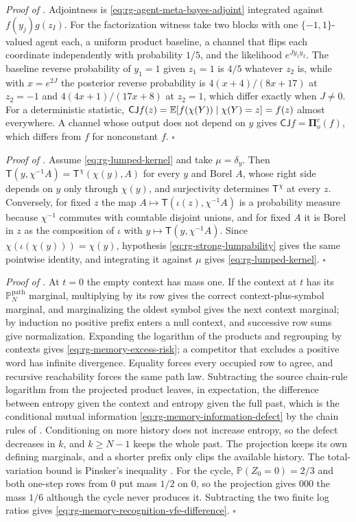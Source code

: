 \noindent\emph{Proof of .}
Adjointness is \eqref{eq:rg-agent-meta-bayes-adjoint} integrated against
$f(y_j)g(z_I)$. For the factorization witness take two blocks with one
$\{-1,1\}$-valued agent each, a uniform product baseline, a channel that flips each
coordinate independently with probability $1/5$, and the likelihood
$e^{Jy_1y_2}$. The baseline reverse probability of $y_1=1$ given $z_1=1$ is $4/5$
whatever $z_2$ is, while with $x=e^{2J}$ the posterior reverse probability is
$4(x+4)/(8x+17)$ at $z_2=-1$ and $4(4x+1)/(17x+8)$ at $z_2=1$, which differ exactly
when $J\ne0$. For a deterministic statistic, $\mathsf C\mathsf
Jf(z)=\mathbb E[f(\chi(Y))\mid\chi(Y)=z]=f(z)$ almost everywhere. A channel whose output
does not depend on $y$ gives $\mathsf C\mathsf Jf=\boldsymbol\Pi^c_o(f)$, which
differs from $f$ for nonconstant $f$. $\square$

\noindent\emph{Proof of .}
Assume \eqref{eq:rg-lumped-kernel} and take $\mu=\delta_y$. Then
$\mathsf T(y,\chi^{-1}A)=\mathsf T^\chi(\chi(y),A)$ for every $y$ and Borel $A$,
whose right side depends on $y$ only through $\chi(y)$, and surjectivity determines
$\mathsf T^\chi$ at every $z$. Conversely, for fixed $z$ the map
$A\mapsto\mathsf T(\iota(z),\chi^{-1}A)$ is a probability measure because $\chi^{-1}$
commutes with countable disjoint unions, and for fixed $A$ it is Borel in $z$ as the
composition of $\iota$ with $y\mapsto\mathsf T(y,\chi^{-1}A)$. Since
$\chi(\iota(\chi(y)))=\chi(y)$, hypothesis \eqref{eq:rg-strong-lumpability} gives the
same pointwise identity, and integrating it against $\mu$ gives
\eqref{eq:rg-lumped-kernel}. $\square$

\noindent\emph{Proof of .}
At $t=0$ the empty context has mass one. If the context at $t$ has its
$\mathbb P^{\mathrm{path}}_N$ marginal, multiplying by its row gives the correct
context-plus-symbol marginal, and marginalizing the oldest symbol gives the next
context marginal; by induction no positive prefix enters a null context, and
successive row sums give normalization. Expanding the logarithm of the products and
regrouping by contexts gives \eqref{eq:rg-memory-excess-risk}; a competitor that
excludes a positive word has infinite divergence. Equality forces every occupied row
to agree, and recursive reachability forces the same path law. Subtracting the
source chain-rule logarithm from the projected product leaves, in expectation, the
difference between entropy given the context and entropy given the full past, which
is the conditional mutual information \eqref{eq:rg-memory-information-defect} by the
chain rules of \citet[Sec.~2.5]{CoverThomas2006}. Conditioning on more history does
not increase entropy, so the defect decreases in $k$, and $k\ge N-1$ keeps the whole
past. The projection keeps its own defining marginals, and a shorter prefix only
clips the available history. The total-variation bound is Pinsker's inequality
\citep[Lemma~11.6.1]{CoverThomas2006}. For the cycle,
$\mathbb P(Z_0=0)=2/3$ and both one-step rows from $0$ put mass $1/2$ on $0$, so the
projection gives $000$ the mass $1/6$ although the cycle never produces it.
Subtracting the two finite log ratios gives
\eqref{eq:rg-memory-recognition-vfe-difference}. $\square$

